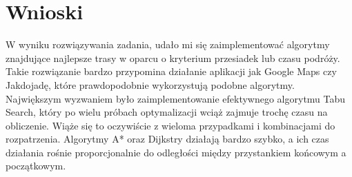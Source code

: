 \documentclass{article}
\begin{document}
\section*{Wnioski}
W wyniku rozwiązywania zadania, udało mi się zaimplementować algorytmy znajdujące najlepsze trasy w oparcu o kryterium przesiadek lub czasu podróży.
Takie rozwiązanie bardzo przypomina działanie aplikacji jak Google Maps czy Jakdojadę, które prawdopodobnie wykorzystują podobne algorytmy.
Największym wyzwaniem było zaimplementowanie efektywnego algorytmu Tabu Search, który po wielu próbach optymalizacji wciąż zajmuje trochę czasu na obliczenie.
Wiąże się to oczywiście z wieloma przypadkami i kombinacjami do rozpatrzenia. Algorytmy A* oraz Dijkstry działają bardzo szybko, a ich czas działania rośnie proporcjonalnie do
odległości między przystankiem końcowym a początkowym.
\end{document}
